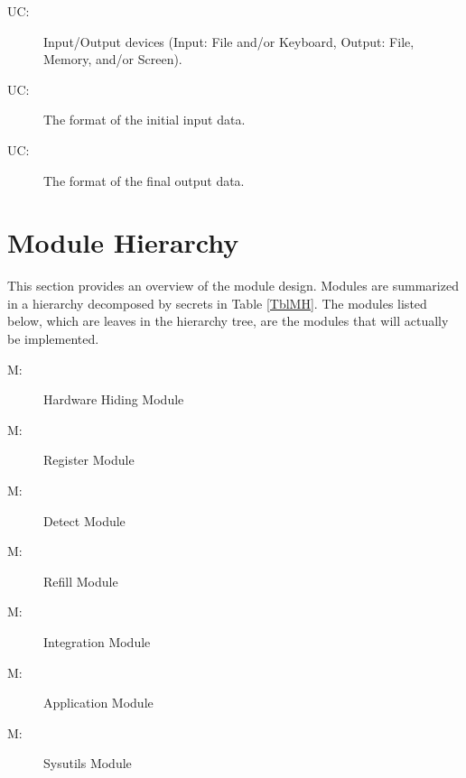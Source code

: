 \documentclass[12pt, titlepage]{article}
\newcounter{ucnum}
\newcommand{\uctheucnum}{UC\theucnum}
\newcounter{mnum}
\newcommand{\mthemnum}{M\themnum}
\begin{document}
\begin{description}
\item[ \uctheucnum \label{ucIO}:] Input/Output devices (Input: File and/or Keyboard, Output: File, Memory, and/or Screen).

\item[ \uctheucnum \label{ucInput}:] The format of the initial input data.

\item[ \uctheucnum \label{ucOutput}:] The format of the final output data.



\end{description}

\section{Module Hierarchy} \label{SecMH}

This section provides an overview of the module design. Modules are summarized
in a hierarchy decomposed by secrets in Table \ref{TblMH}. The modules listed
below, which are leaves in the hierarchy tree, are the modules that will
actually be implemented.

\begin{description}
\item [ \mthemnum \label{mHH}:] Hardware Hiding Module

\item [ \mthemnum \label{mHH}:] Register Module

\item [ \mthemnum \label{mHH}:] Detect Module

\item [ \mthemnum \label{mHH}:] Refill Module

\item [ \mthemnum \label{mHH}:] Integration Module

\item [ \mthemnum \label{mHH}:] Application Module

\item [ \mthemnum \label{mHH}:] Sysutils Module

\end{description}
\end{document}
